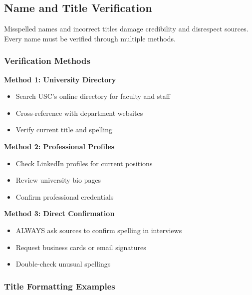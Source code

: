 \documentclass[12pt]{article}
\begin{document}
\newpage 
\subsection{Name and Title Verification}
\label{sec:name-verification}

Misspelled names and incorrect titles damage credibility and disrespect sources. Every name must be verified through multiple methods.

\subsubsection{Verification Methods}

\begin{examplebox}
\textbf{Method 1: University Directory}
\begin{itemize}
    \item Search USC's online directory for faculty and staff
    \item Cross-reference with department websites
    \item Verify current title and spelling
\end{itemize}
\end{examplebox}

\begin{examplebox}
\textbf{Method 2: Professional Profiles}
\begin{itemize}
    \item Check LinkedIn profiles for current positions
    \item Review university bio pages
    \item Confirm professional credentials
\end{itemize}
\end{examplebox}

\begin{examplebox}
\textbf{Method 3: Direct Confirmation}
\begin{itemize}
    \item ALWAYS ask sources to confirm spelling in interviews
    \item Request business cards or email signatures
    \item Double-check unusual spellings
\end{itemize}
\end{examplebox}

\subsubsection{Title Formatting Examples}
\end{document}
